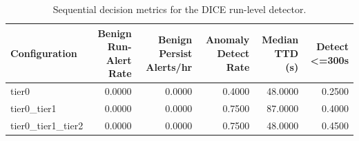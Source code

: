 \begin{table}[t]
\centering
\caption{Sequential decision metrics for the DICE run-level detector.}
\label{tab:dice_sequential_metrics}
\footnotesize
\begin{tabular}{lrrrrr}
\toprule
Configuration & Benign Run-Alert Rate & Benign Persist Alerts/hr & Anomaly Detect Rate & Median TTD (s) & Detect <=300s \\
\midrule
tier0 & 0.0000 & 0.0000 & 0.4000 & 48.0000 & 0.2500 \\
tier0_tier1 & 0.0000 & 0.0000 & 0.7500 & 87.0000 & 0.4000 \\
tier0_tier1_tier2 & 0.0000 & 0.0000 & 0.7500 & 48.0000 & 0.4500 \\
\bottomrule
\end{tabular}

\end{table}
